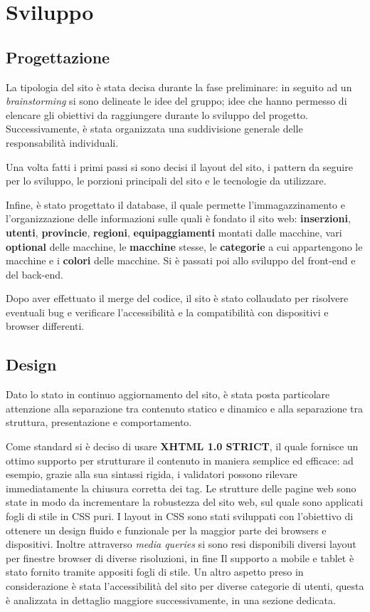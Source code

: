 \section{Sviluppo}
	\subsection{Progettazione}
	\par La tipologia del sito è stata decisa durante la fase preliminare: in seguito ad un \textit{brainstorming} si sono delineate le idee del gruppo; idee che hanno permesso di elencare gli obiettivi da raggiungere durante lo sviluppo del progetto. Successivamente, è stata organizzata una suddivisione generale delle responsabilità individuali. 
	\par Una volta fatti i primi passi si sono decisi il layout del sito, i pattern da seguire per lo sviluppo, le porzioni principali del sito e le tecnologie da utilizzare.
	\par Infine, è stato progettato il database, il quale permette l’immagazzinamento e l’organizzazione delle informazioni sulle quali è fondato il sito web: \textbf{inserzioni}, \textbf{utenti}, \textbf{provincie}, \textbf{regioni}, \textbf{equipaggiamenti} montati dalle macchine, vari \textbf{optional} delle macchine, le \textbf{macchine} stesse, le \textbf{categorie} a cui appartengono le macchine e i \textbf{colori} delle macchine. Si è passati poi allo sviluppo del front-end e del back-end.
	\par Dopo aver effettuato il merge del codice, il sito è stato collaudato per risolvere eventuali bug e verificare l’accessibilità e la compatibilità con dispositivi e browser differenti.
	\subsection{Design}
	\par Dato lo stato in continuo aggiornamento del sito, è stata posta particolare attenzione alla separazione tra contenuto statico e dinamico e alla separazione tra struttura, presentazione e comportamento.
	\par Come standard si è deciso di usare \textbf{XHTML 1.0 STRICT}, il quale fornisce un ottimo supporto per strutturare il contenuto in maniera semplice ed efficace: ad esempio, grazie alla sua sintassi rigida, i validatori possono rilevare immediatamente la chiusura corretta dei tag.
Le strutture delle pagine web sono state  in modo da incrementare la robustezza del sito web, sul quale sono applicati fogli di stile in CSS puri. I layout in CSS sono stati sviluppati con l'obiettivo di ottenere un design fluido e funzionale per la maggior parte dei browsers e dispositivi. Inoltre attraverso \textit{media queries} si sono resi disponibili diversi layout per finestre browser di diverse risoluzioni, in fine Il supporto a mobile e tablet è stato fornito tramite appositi fogli di stile.
Un altro aspetto preso in considerazione è stata l’accessibilità del sito per diverse categorie di utenti, questa è analizzata in dettaglio maggiore successivamente, in una sezione dedicata.
